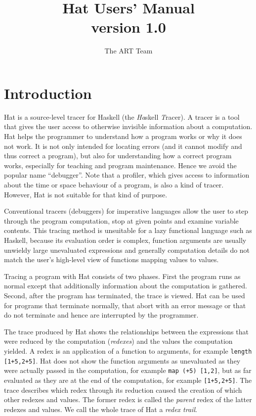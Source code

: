 \documentclass[12pt]{article}
\begin{document}
\title{Hat Users' Manual\\version 1.0}
\author{The ART Team}
\date{}
\maketitle
\vspace*{-8ex}

\thispagestyle{empty}

\tableofcontents


\section{Introduction}\label{introduction}

Hat is a source-level tracer for Haskell (the \emph{Ha}skell \emph{T}racer). A tracer is a tool that gives the user access to otherwise invisible information about a computation. Hat helps the programmer to understand how a program works or why it does not work. It is not only intended for locating errors (and it cannot modify and thus correct a program), but also for understanding how a correct program works, especially for teaching and program maintenance. Hence we avoid the popular name ``debugger''. Note that a profiler, which gives access to information about the time or space behaviour of a program, is also a kind of tracer. However, Hat is not suitable for that kind of purpose.

Conventional tracers (debuggers) for imperative languages allow the user to step through the program computation, stop at given points and examine variable contents.
This tracing method is unsuitable for a lazy functional language such as Haskell, because its evaluation order is complex, function arguments are usually unwieldy large unevaluated expressions and generally computation details do not match the user's high-level view of functions mapping values to values.

Tracing a program with Hat consists of two phases. First the program runs as normal except that additionally information about the computation is gathered. Second, after the program has terminated, the trace is viewed. 
Hat can be used for programs that terminate normally, that abort with an error message or that do not terminate and hence are interrupted by the programmer.

The trace produced by Hat shows the relationships between the expressions that were reduced by the computation (\emph{redexes}) and the values the computation yielded. A redex is an application of a function to arguments, for example \texttt{length [1+5,2+5]}. Hat does not show the function arguments as unevaluated as they were actually passed in the computation, for example \texttt{map (+5) [1,2]}, but as far evaluated as they are at the end of the computation, for example \texttt{[1+5,2+5]}. The trace describes which redex through its reduction caused the creation of which other redexes and values. The former redex is called the \emph{parent} redex of the latter redexes and values. We call the whole trace of Hat a \emph{redex trail}.
\end{document}
